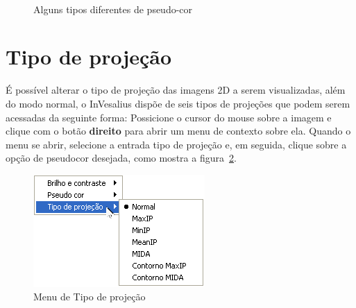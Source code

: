 \begin{figure}[h]
  \\
  \caption{Alguns tipos diferentes de pseudo-cor}
  \label{fig:pseudo_color_types}
\end{figure}

\newpage

\section{Tipo de projeção}

É possível alterar o tipo de projeção das imagens 2D a serem visualizadas, além do modo normal, o InVesalius dispõe de seis tipos de projeções que podem serem acessadas da seguinte forma: Possicione o cursor do mouse sobre a imagem e clique com o botão \textbf{direito} para abrir um menu de contexto sobre ela. Quando o menu se abrir, selecione a entrada tipo de projeção e, em seguida, clique sobre a opção de pseudocor desejada, como mostra a figura~\ref{fig:menu_proj}.

\begin{figure}[H]
\centering
\includegraphics[scale=0.60]{../user_guide_figures/invesalius_screen/menu_projection_pt.png}
\caption{Menu de Tipo de projeção}
\label{fig:menu_proj}
\end{figure}

